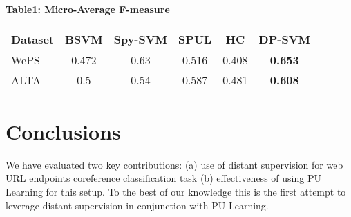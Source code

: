 \documentclass{sig-alternate-05-2015}
\begin{document}


\begin{small}
\begin{center}
\small \textbf{Table1: Micro-Average F-measure}
 \begin{tabular}{ | l|c|c|c|c|c|c|}
    \hline
Dataset &  BSVM &Spy-SVM& SPUL  & HC & DP-SVM  \\ \hline
  WePS &   0.472 &  0.63 & 0.516  &  0.408 & \textbf{0.653}\\ \hline
    ALTA &  0.5 &0.54 & 0.587  &  0.481 & \textbf{0.608}\\ \hline
  \end{tabular}
\end{center}
\end{small}


%


\section{Conclusions}
We have evaluated two key contributions: (a) use of distant supervision for web URL endpoints coreference classification task (b) effectiveness of using PU Learning for this setup. To the best of our knowledge this is the first attempt to leverage distant supervision in conjunction with PU Learning. 

  
\end{document}
